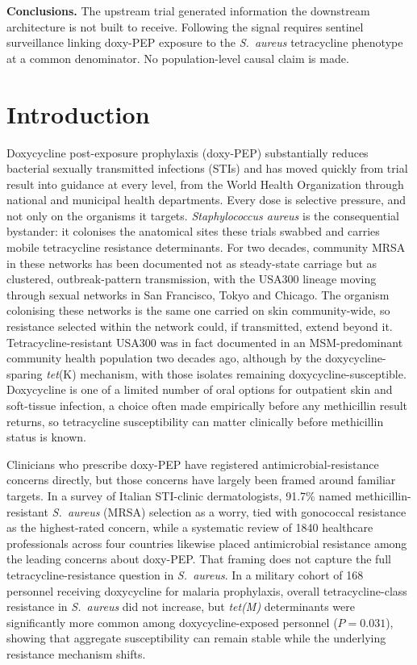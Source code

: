 \documentclass[12pt,a4paper]{article}
\newcommand{\sa}{\emph{S.~aureus}}
\newcommand{\Sa}{\emph{Staphylococcus aureus}}
\begin{document}
\noindent\textbf{Conclusions.} The upstream trial generated information the
downstream architecture is not built to receive. Following the signal requires
sentinel surveillance linking doxy-PEP exposure to the \sa{} tetracycline
phenotype at a common denominator. No population-level causal claim is made.

\vspace{1em}
\linenumbers

\section*{Introduction}

Doxycycline post-exposure prophylaxis (doxy-PEP) substantially reduces bacterial
sexually transmitted infections (STIs) and has moved quickly from trial result
into guidance at every level, from the World Health Organization through national
and municipal health departments.\cite{luetkemeyer2023,cdc2024doxypep} Every dose
is selective pressure, and not only on the organisms it targets. \Sa{} is the
consequential bystander: it colonises the anatomical sites these trials swabbed
and carries mobile tetracycline resistance determinants.\cite{grossman2016} For
two decades, community MRSA in these networks has been documented not as
steady-state carriage but as clustered, outbreak-pattern transmission, with the
USA300 lineage moving through sexual networks in San Francisco, Tokyo and
Chicago.\cite{diep2008,dejong2025} The organism colonising these networks is the
same one carried on skin community-wide, so resistance selected within the
network could, if transmitted, extend beyond it. Tetracycline-resistant USA300
was in fact documented in an MSM-predominant community health population two
decades ago, although by the doxycycline-sparing \emph{tet}(K) mechanism, with
those isolates remaining doxycycline-susceptible.\cite{han2007} Doxycycline is
one of a limited number of oral options for outpatient skin and soft-tissue
infection, a choice often made empirically before any methicillin result
returns,\cite{stevens2014,liu2011} so tetracycline susceptibility can matter
clinically before methicillin status is known.

Clinicians who prescribe doxy-PEP have registered antimicrobial-resistance
concerns directly, but those concerns have largely been framed around familiar
targets. In a survey of Italian STI-clinic dermatologists, 91.7\% named
methicillin-resistant \sa{} (MRSA) selection as a worry, tied with gonococcal
resistance as the highest-rated concern,\cite{dona2026} while a systematic
review of 1840 healthcare professionals across four countries likewise placed
antimicrobial resistance among the leading concerns about doxy-PEP.\cite{spence2026}
That framing does not capture the full tetracycline-resistance question in
\sa{}. In a military cohort of 168 personnel receiving doxycycline for malaria
prophylaxis, overall tetracycline-class resistance in \sa{} did not increase,
but \textit{tet(M)} determinants were significantly more common among
doxycycline-exposed personnel ($P=0.031$), showing that aggregate susceptibility
can remain stable while the underlying resistance mechanism shifts.\cite{mende2016}
\end{document}
